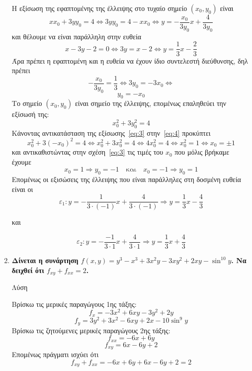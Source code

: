 \begin{enumerate}
    Η εξίσωση της εφαπτομένης της έλλειψης στο τυχαίο σημείο $ (x_{0}, y_{0}) $ είναι
    \[
        x x_{0} + 3y y_{0}= 4 \Leftrightarrow 3y y_{0} = 4 - x x_{0}  \Leftrightarrow y =
        -\frac{x_{0}}{3 y_{0}}x + \frac{4}{3 y_{0}} 
    \]
    και θέλουμε να είναι παράλληλη στην ευθεία 
    \[
    x-3y-2=0 \Leftrightarrow 3y=x-2 \Leftrightarrow y = \frac{1}{3} x - \frac{2}{3}  
    \]
    Άρα πρέπει η εφαπτομένη και η ευθεία να έχουν ίδιο συντελεστή διεύθυνσης, δηλ πρέπει
    \[
       -\frac{x_{0}}{3 y_{0}} = \frac{1}{3} \Leftrightarrow 3 y_{0} = -3 x_{0} \Leftrightarrow 
        \]
        \begin{equation}\label{eq:3}
        y_{0}=- x_{0} 
    \end{equation} 
    Το σημείο $ (x_{0}, y_{0}) $ είναι σημείο της έλλειψης, επομένως επαληθεύει την εξίσωσή της:
    \begin{equation}\label{eq:4}
        x_{0}^{2}+3 y_{0}^{2}=4 
    \end{equation} 
    Κάνοντας αντικατάσταση της εξίσωσης~\eqref{eq:3} στην~\eqref{eq:4} προκύπτει
    \[
        x_{0}^2+3(- x_{0})^{2}=4 \Leftrightarrow x_{0}^{2} + 3 x_{0}^{2} = 4 \Leftrightarrow 4
        x_{0}^{2} = 4 \Leftrightarrow x_{0}^{2} = 1 \Leftrightarrow x_{0} = \pm 1
    \] 
    και αντικαθιστώντας στην σχέση~\eqref{eq:3} τις τιμές του $ x_{0} $ που μόλις βρήκαμε έχουμε
    \[
        x_{0}=1 \Rightarrow y_{0}=-1 \quad \text{και} \quad x_{0}=-1 \Rightarrow y_{0}=1 
    \] 
Επομένως οι εξισώσεις της έλλειψης που είναι παράλληλες στη δοσμένη ευθεία είναι οι
\[
    \varepsilon_{1}: y = - \frac{1}{3\cdot (-1)} x + \frac{4}{3\cdot (-1)} \Rightarrow  \boxed {y =
    \frac{1}{3} x - \frac{4}{3}}
\] 

και 

\[
    \varepsilon_{2}: y = - \frac{-1}{3 \cdot 1} x + \frac{4}{3 \cdot 1} \Rightarrow \boxed{y=
    \frac{1}{3} x + \frac{4}{3}}
\] 

    \item  {\bfseries Δίνεται η συνάρτηση \boldmath $ f(x,y) = y^{3} - x^{3}
        +3x^{2}y - 3xy^{2} + 2xy - \sin^{10}{y} $.
    Να δειχθεί ότι \boldmath $ f_{xy}+f_{xx} = 2 $.}

        \begin{description}
            \item[Λύση]
        \end{description}

Βρίσκω τις μερικές παραγώγους 1ης τάξης:
\[ f_{x} = -3x^{2} + 6xy - 3y^{2} + 2y \]
\[ f_{y} = 3y^{2}+3x^{2}-6xy +2x - 10 \sin^{9}{y}  \]
Βρίσκω τις ζητούμενες μερικές παραγώγους 2ης τάξης:
\[
    f_{xx} =  -6x+6y
\] 
\[
    f_{xy} = 6x -6y +2
\] 
Επομένως πράγματι ισχύει ότι
\[
    f_{xy}+ f_{xx} = -6x+6y+6x-6y+2 = 2
\] 



\end{enumerate}
